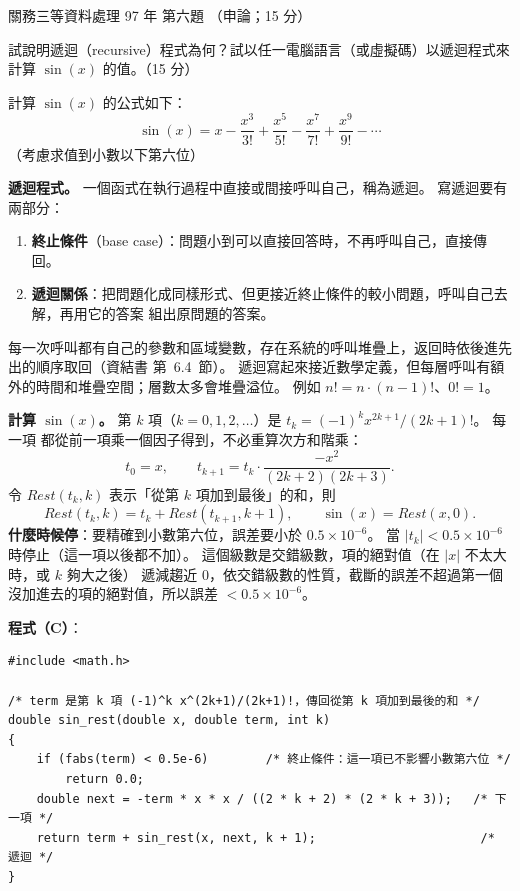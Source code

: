 \begin{pastexam}[label={px:gw3-097-ds-06}]{關務三等資料處理 97 年 第六題}
（申論；15 分）

試說明遞迴（recursive）程式為何？試以任一電腦語言（或虛擬碼）以遞迴程式來計算 $\sin(x)$ 的值。（15 分）

計算 $\sin(x)$ 的公式如下：
\[
\sin(x) = x - \frac{x^3}{3!} + \frac{x^5}{5!} - \frac{x^7}{7!} + \frac{x^9}{9!} - \cdots
\]
（考慮求值到小數以下第六位）
\end{pastexam}

\begin{pastsoln}
\textbf{遞迴程式。} 一個函式在執行過程中直接或間接呼叫自己，稱為遞迴。 寫遞迴要有兩部分：
\begin{enumerate}[nosep]
\item \textbf{終止條件}（base case）：問題小到可以直接回答時，不再呼叫自己，直接傳回。
\item \textbf{遞迴關係}：把問題化成同樣形式、但更接近終止條件的較小問題，呼叫自己去解，再用它的答案
組出原問題的答案。
\end{enumerate}
每一次呼叫都有自己的參數和區域變數，存在系統的呼叫堆疊上，返回時依後進先出的順序取回（資結書
第~6.4~節）。 遞迴寫起來接近數學定義，但每層呼叫有額外的時間和堆疊空間；層數太多會堆疊溢位。
例如 $n! = n \cdot (n-1)!$、$0! = 1$。

\textbf{計算 $\sin(x)$。} 第 $k$ 項（$k = 0, 1, 2, \ldots$）是 $t_k = (-1)^k x^{2k+1}/(2k+1)!$。 每一項
都從前一項乘一個因子得到，不必重算次方和階乘：
\[
t_0 = x, \qquad t_{k+1} = t_k \cdot \frac{-x^2}{(2k+2)(2k+3)} .
\]
令 $\mathit{Rest}(t_k, k)$ 表示「從第 $k$ 項加到最後」的和，則
\[
\mathit{Rest}(t_k, k) = t_k + \mathit{Rest}(t_{k+1}, k+1), \qquad \sin(x) = \mathit{Rest}(x, 0).
\]
\textbf{什麼時候停}：要精確到小數第六位，誤差要小於 $0.5 \times 10^{-6}$。 當 $|t_k| < 0.5 \times 10^{-6}$
時停止（這一項以後都不加）。 這個級數是交錯級數，項的絕對值（在 $|x|$ 不太大時，或 $k$ 夠大之後）
遞減趨近 $0$，依交錯級數的性質，截斷的誤差不超過第一個沒加進去的項的絕對值，所以誤差
$< 0.5 \times 10^{-6}$。

\textbf{程式（C）}：
\begin{verbatim}
#include <math.h>

/* term 是第 k 項 (-1)^k x^(2k+1)/(2k+1)!，傳回從第 k 項加到最後的和 */
double sin_rest(double x, double term, int k)
{
    if (fabs(term) < 0.5e-6)        /* 終止條件：這一項已不影響小數第六位 */
        return 0.0;
    double next = -term * x * x / ((2 * k + 2) * (2 * k + 3));   /* 下一項 */
    return term + sin_rest(x, next, k + 1);                       /* 遞迴 */
}


\end{verbatim}
\end{pastsoln}
